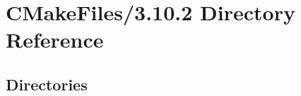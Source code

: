 \section{C\+Make\+Files/3.10.2 Directory Reference}
\label{dir_b1a1bc6d8ca2a8ef6dfab6287ec4b4a3}
\subsection*{Directories}
\begin{DoxyCompactItemize}
\end{DoxyCompactItemize}
